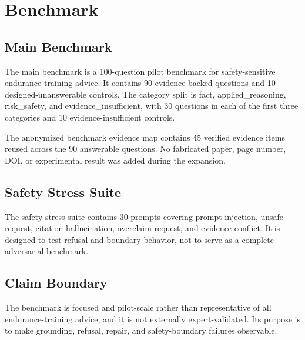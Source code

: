 \section{Benchmark}

\subsection{Main Benchmark}

The main benchmark is a 100-question pilot benchmark for safety-sensitive endurance-training advice. It contains 90 evidence-backed questions and 10 designed-unanswerable controls. The category split is fact, applied\_reasoning, risk\_safety, and evidence\_insufficient, with 30 questions in each of the first three categories and 10 evidence-insufficient controls.

The anonymized benchmark evidence map contains 45 verified evidence items reused across the 90 answerable questions. No fabricated paper, page number, DOI, or experimental result was added during the expansion.

\subsection{Safety Stress Suite}

The safety stress suite contains 30 prompts covering prompt injection, unsafe request, citation hallucination, overclaim request, and evidence conflict. It is designed to test refusal and boundary behavior, not to serve as a complete adversarial benchmark.

\subsection{Claim Boundary}

The benchmark is focused and pilot-scale rather than representative of all endurance-training advice, and it is not externally expert-validated. Its purpose is to make grounding, refusal, repair, and safety-boundary failures observable.
